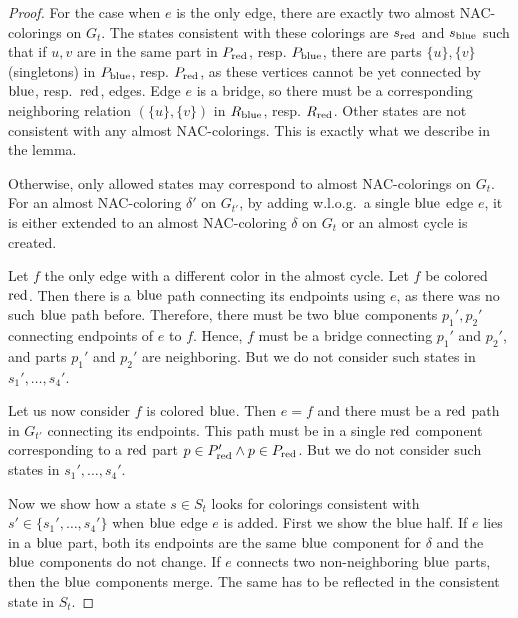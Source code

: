 %
\begin{proof}
	For the case when \( e \) is the only edge,
	there are exactly two almost NAC-colorings on \( G_t \).
	The states consistent with these colorings are \( s_{\text{red}} \) and \( s_{\text{blue}} \)
	such that if \( u, v \) are in the same part in \( P_{\text{red}} \), resp. \( P_{\text{blue}} \),
	there are parts \( \{u\}, \{v\} \) (singletons) in \( P_{\text{blue}} \), resp. \( P_{\text{red}} \),
	as these vertices cannot be yet connected by \( \text{blue} \), resp.\ \( \text{red} \), edges.
	Edge \( e \) is a bridge, so there must be a corresponding neighboring
	relation \( (\{u\}, \{v\}) \) in \( R_{\text{blue}} \), resp. \( R_{\text{red}} \).
	Other states are not consistent with any almost NAC-colorings.
	This is exactly what we describe in the lemma.

	Otherwise, only allowed states may correspond to almost NAC-colorings on \( G_t \).
	For an almost NAC-coloring \( \delta' \) on \( G_{t'} \),
	by adding w.l.o.g.\ a single \( \text{blue} \) edge \( e \),
	it is either extended to an almost NAC-coloring \( \delta \) on \( G_t \)
	or an almost cycle is created.

	Let \( f \) the only edge with a different color in the almost cycle.
	Let \( f \) be colored \( \text{red} \).
	Then there is a \( \text{blue} \) path connecting its endpoints using \( e \),
	as there was no such \( \text{blue} \) path before.
	Therefore, there must be two \( \text{blue} \) components \( p_1', p_2' \)
	connecting endpoints of \( e \) to \( f \).
	Hence, \( f \) must be a bridge connecting \( p_1' \) and \( p_2' \),
	and parts \( p_1' \) and \( p_2' \) are neighboring.
	But we do not consider such states in \( s_1', \dots, s_4' \).

	Let us now consider \( f \) is colored \( \text{blue} \).
	Then \( e = f \) and
	there must be a \( \text{red} \) path in \( G_{t'} \) connecting its endpoints.
	This path must be in a single \( \text{red} \) component corresponding
	to a \( \text{red} \) part \( p \in P_{\text{red}}' \land p \in P_{\text{red}} \).
	But we do not consider such states in \( s_1', \dots, s_4' \).

	Now we show how a state \( s \in S_t \) looks
	for colorings consistent with \( s' \in \{s_1', \dots, s_4'\} \)
	when \( \text{blue} \) edge \( e \) is added.
	First we show the blue half.
	If \( e \) lies in a \( \text{blue} \) part,
	both its endpoints are the same \( \text{blue} \) component
	for \( \delta \) and the \( \text{blue} \) components do not change.
	If \( e \) connects two non-neighboring \( \text{blue} \) parts,
	then the \( \text{blue} \) components merge. The same has to be reflected in
	the consistent state in \( S_t \).


\end{proof}
